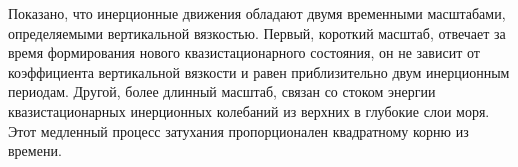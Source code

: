 Показано, что инерционные движения обладают двумя временными масштабами, определяемыми вертикальной вязкостью. Первый, короткий масштаб, отвечает за время формирования нового квазистационарного состояния, он не зависит от коэффициента вертикальной вязкости и равен приблизительно двум инерционным периодам.
Другой, более длинный масштаб, связан со стоком энергии квазистационарных инерционных колебаний из верхних в глубокие слои моря. Этот медленный процесс затухания пропорционален квадратному корню из времени.

\FloatBarrier
